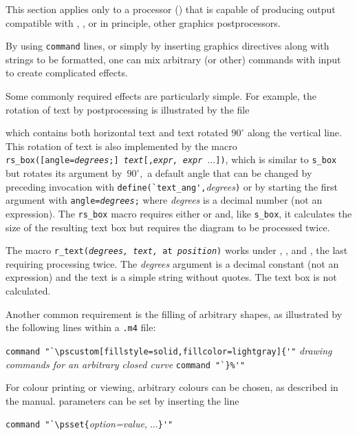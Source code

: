 This section applies only to a \pic processor (\dpic) that is
capable of producing output compatible with
\PSTricks, \TPGF, or in principle, other graphics postprocessors. 

By using {\tt command} lines,
or simply by inserting \latex graphics directives along with strings to
be formatted, one can mix
arbitrary \PSTricks (or other) commands with \Mfour input
to create complicated effects. 

Some commonly required effects are particularly simple. For example,
the rotation of text by \PSTricks postprocessing is illustrated by the file

{\small }

\noindent%
which contains both horizontal text and text rotated $90^\circ$ along the
vertical line.
This rotation of text is also implemented by the macro
{\tt rs\_box([angle={\sl degrees};] {\sl text}[,{\sl expr, expr $\ldots$}])},
which is similar
to {\tt s\_box} but rotates its argument by~$90^\circ,$ a default angle
that can be changed by preceding invocation with
\verb|define(`text_ang',|{\sl degrees}{\tt )}
or by starting the first argument with {\tt angle={\sl degrees};}
where {\sl degrees} is a decimal number (not an expression).
The {\tt rs\_box} macro
requires either \PSTricks or \TPGF and, like {\tt s\_box}, it calculates the
size of the resulting text box but requires the diagram to be
processed twice.

The macro {\tt r\_text({\sl degrees, text,} at {\sl position})}
works under \PSTricks, \TPGF, and \SVG, the last requiring
processing twice. The {\sl degrees} argument is a decimal constant
(not an expression) and the text is a simple string without quotes.
The text box is not calculated.

Another common requirement is the filling of arbitrary shapes, as
illustrated by the following lines within a {\tt .m4} file:

\vspace{\parsep}
\noindent%
\verb|command "`\pscustom[fillstyle=solid,fillcolor=lightgray]{'"|
\hfill\break
{\sl drawing commands for an arbitrary closed curve}
\hfill\break
\verb|command "`}%'"|
\vspace{\parsep}

For colour printing or viewing, arbitrary
colours can be chosen, as described in the \PSTricks manual.
\PSTricks parameters can be set by inserting the line

\vspace{\parsep}
\noindent\verb|command "`\psset{|{\sl option=value,}$\;\ldots$\verb|}'"|
\vspace{\parsep}

